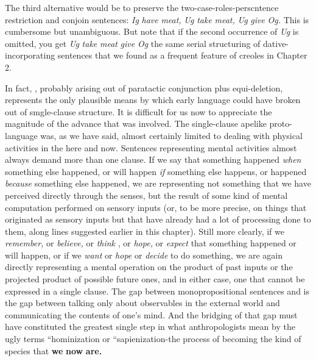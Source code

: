 The third alternative would be to preserve the two-case-roles-per\-scntence restriction and conjoin sentences: \textit{Ig} \textit{have} \textit{meat,} \textit{Ug} \textit{take} \textit{meat,} \textit{Ug} \textit{give} \textit{Og.} This is cumbersome but unambiguous. But note that if the second occurrence of \textit{Ug} is omitted, you get \textit{Ug} \textit{take} \textit{meat} \textit{give} \textit{Og\-} the same serial structuring of dative-incorporating sentences that we found as a frequent feature of creoles in Chapter 2.

In fact, , probably arising out of paratactic con\-junction plus equi-deletion, represents the only plausible means by which early language could have broken out of smgle-clause structure. It is difficult for us now to appreciate the magnitude of the advance that was involved. The single-clause apelike proto-language was, as we have said, almost certainly limited to dealing with physical activities in the here and now. Sentences representing mental activities almost always demand more than one clause. If we say that something hap\-pened \textit{when} something else happened, or will happen \textit{if} something else happens, or happened \textit{because} something else happened, we are repre\-senting not something that we have perceived directly through the senses, but the result of some kind of mental computation performed
on sensory inputs (or, to be more precise, on things that originated as sensory inputs but that have already had a lot of processing done to them, along lines suggested earlier in this chapter). Still more clearly, if we \textit{remember,} or \textit{believe,} or \textit{think} , or \textit{hope,} or \textit{expect} that something happened or will happen, or if we \textit{want} or \textit{hope} or \textit{decide} to do some\-thing, we are again directly representing a mental operation on the product of past inputs or the projected product of possible future ones, and in either case, one that cannot be expressed in a single clause. The gap between monopropositional sentences and  is the gap between talking only about observables in the external world and communicating the contents of one's mind. And the bridging of that gap must have constituted the greatest single step in what anthropologists mean by the ugly terms ``hominization or ``sapienization{\textquotedbl}{}-the process of becoming the kind of species that \textbf{we} \textbf{now} \textbf{are.}

